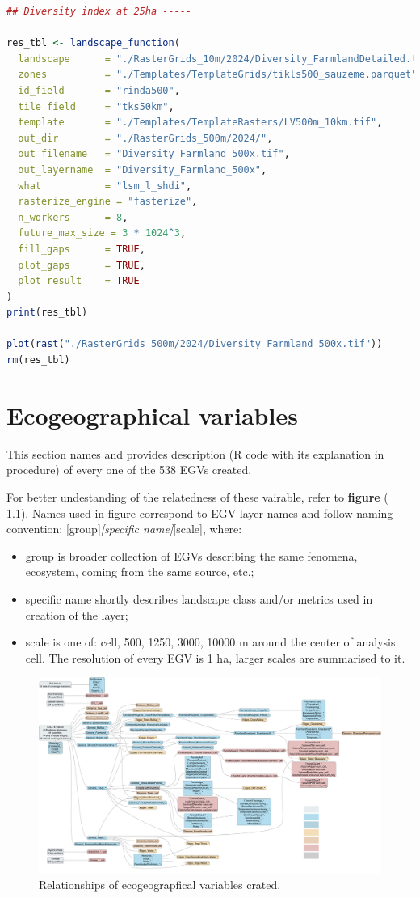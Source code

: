 \documentclass[
]{book}
\begin{document}
\begin{lstlisting}[language=R]
## Diversity index at 25ha -----

res_tbl <- landscape_function(
  landscape      = "./RasterGrids_10m/2024/Diversity_FarmlandDetailed.tif",
  zones          = "./Templates/TemplateGrids/tikls500_sauzeme.parquet",
  id_field       = "rinda500",
  tile_field     = "tks50km",
  template       = "./Templates/TemplateRasters/LV500m_10km.tif",
  out_dir        = "./RasterGrids_500m/2024/",
  out_filename   = "Diversity_Farmland_500x.tif",
  out_layername  = "Diversity_Farmland_500x",
  what           = "lsm_l_shdi",
  rasterize_engine = "fasterize",
  n_workers      = 8,
  future_max_size = 3 * 1024^3,
  fill_gaps      = TRUE,
  plot_gaps      = TRUE,
  plot_result    = TRUE
)
print(res_tbl)

plot(rast("./RasterGrids_500m/2024/Diversity_Farmland_500x.tif"))
rm(res_tbl)
\end{lstlisting}

\chapter{Ecogeographical variables}\label{Ch06}

This section names and provides description (R code with its explanation in
procedure) of every one of the 538 EGVs created.

For better undestanding of the relatedness of these vairable, refer to \textbf{figure}
( \ref{fig:flowchart}).
Names used in figure correspond to EGV layer names and follow naming convention:
{[}group{]}\emph{{[}specific name{]}}{[}scale{]}, where:

\begin{itemize}
\item
  group is broader collection of EGVs describing the same fenomena, ecosystem, coming from the same source, etc.;
\item
  specific name shortly describes landscape class and/or metrics used in creation of the layer;
\item
  scale is one of: cell, 500, 1250, 3000, 10000 m around the center of analysis cell. The resolution of every EGV is 1 ha, larger scales are summarised to it.
\end{itemize}

\begin{figure}
\includegraphics[width=1\linewidth]{../Figures/EGV_FlowChartY_eps_krasains} \caption{Relationships of ecogeograpfical variables crated.}\label{fig:flowchart}
\end{figure}
\end{document}
